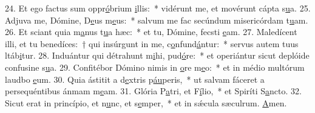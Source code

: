24. Et ego factus sum oppr\uline{ó}brium \uline{i}llis:~* vidérunt me, et movérunt cápta s\uline{u}a.
25. Adjuva me, Dómine, D\uline{e}us m\uline{e}us:~* salvum me fac secúndum misericórdam t\uline{u}am.
26. Et sciant quia m\uline{a}nus t\uline{u}a hæc:~* et tu, Dómine, fecsti \uline{e}am.
27. Maledícent illi, et tu benedíces:~† qui insúrgunt in me, c\uline{o}nfund\uline{á}ntur:~* servus autem tuus ltáb\uline{i}tur.
28. Induántur qui détrahunt m\uline{i}hi, pud\uline{ó}re:~* et operiántur sicut deplóide confusine s\uline{u}a.
29. Confitébor Dómino nimis in \uline{o}re m\uline{e}o:~* et in médio multórum laudbo \uline{e}um.
30. Quia ástitit a d\uline{e}xtris p\uline{áu}peris,~* ut salvam fáceret a persequéntibus ánmam m\uline{e}am.
31. Glória P\uline{a}tri, et F\uline{í}lio,~* et Spiríti S\uline{a}ncto.
32. Sicut erat in princípio, et n\uline{u}nc, et s\uline{e}mper,~* et in sǽcula sæculrum. \uline{A}men.
